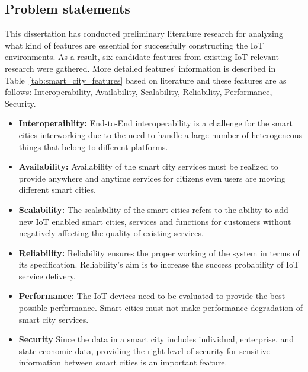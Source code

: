 \subsection{Problem statements}
This dissertation has conducted preliminary literature research for analyzing what kind of features are essential for successfully constructing the IoT environments. As a result, six candidate features from existing IoT relevant research were gathered. More detailed features' information is described in Table~\ref{tab:smart_city_features} based on literature and these features are as follows: Interoperability, Availability, Scalability, Reliability, Performance, Security.



\begin{itemize}
    \item \textbf{Interoperaiblity:} End-to-End interoperability is a challenge for the smart cities interworking due to the need to handle a large number of heterogeneous things that belong to different platforms.

    \item \textbf{Availability:} Availability of the smart city services must be realized to provide anywhere and anytime services for citizens even users are moving different smart cities.

    \item \textbf{Scalability:} The scalability of the smart cities refers to the ability to add new IoT enabled smart cities, services and functions for customers without negatively affecting the quality of existing services.

    \item \textbf{Reliability:} Reliability ensures the proper working of the system in terms of its specification. Reliability's aim is to increase the success probability of IoT service delivery.

    \item \textbf{Performance:} The IoT devices need to be evaluated to provide the best possible performance. Smart cities must not make performance degradation of smart city services.

 
    \item \textbf{Security} Since the data in a smart city includes individual, enterprise, and state economic data, providing the right level of security for sensitive information between smart cities is an important feature.
\end{itemize}

